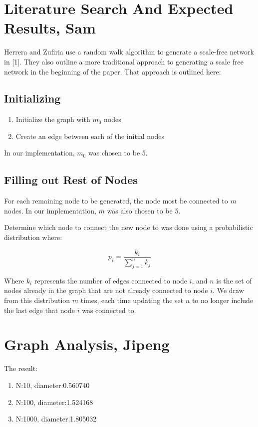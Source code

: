 \documentclass[a4paper,11pt]{article}
\begin{document}
\maketitle
\thispagestyle{empty}


\section{Literature Search And Expected Results, Sam}

Herrera and Zufiria use a random walk algorithm to generate a scale-free network in [1].  They also outline  a more traditional approach to generating a scale free network in the beginning of the paper.  That approach is outlined here:

\subsection{Initializing}
\begin{enumerate}
\item{Initialize the graph with $m_0$ nodes}
\item{Create an edge between each of the initial nodes}
\end{enumerate}

In our implementation, $m_0$ was chosen to be 5.

\subsection{Filling out Rest of Nodes}
For each remaining node to be generated, the node most be connected to $m$ nodes.  In our implementation, $m$ was also chosen to be 5.

Determine which node to connect the new node to was done using a probabilistic distribution where:

\begin{equation} \nonumber
p_{i}=\dfrac{k_{i}}{\sum_{j=1}^{n}k_{j}}
\end{equation}

Where $k_{i}$ represents the number of edges connected to node $i$, and $n$ is the set of nodes already in the graph that are not already connected to node $i$.  We draw from this distribution $m$ times, each time updating the set $n$ to no longer include the last edge that node $i$ was connected to.



 
\section{Graph Analysis, Jipeng}
The result:
\begin{enumerate}
\item N:10,   diameter:0.560740
\item N:100,  diameter:1.524168
\item N:1000, diameter:1.805032
\end{enumerate}
\end{document}
